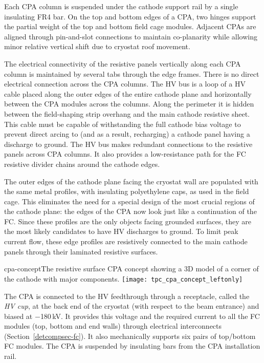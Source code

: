 Each CPA column is suspended under the cathode support rail by a single insulating FR4 bar.  On the top and bottom edges of a CPA, two hinges support the partial weight of the top and bottom field cage modules.   Adjacent CPAs are aligned through pin-and-slot connections to maintain co-planarity while allowing minor relative vertical shift due to cryostat roof movement.

The electrical connectivity of the resistive panels vertically along each CPA column is maintained by several tabs through the edge frames.  There is no direct electrical connection across the CPA columns. 
The HV bus is a loop of a HV cable placed along the outer edges of the entire cathode plane and horizontally between the CPA modules across the columns. Along the perimeter it is hidden between the field-shaping strip overhang and the main cathode resistive sheet.  This cable must be capable of withstanding the full cathode bias voltage to prevent direct arcing to (and as a result, recharging) a cathode panel having a discharge to ground. 
The HV bus makes redundant connections to the resistive panels across CPA columns.  It also provides a low-resistance path for the FC resistive divider chains around the cathode edges.

The outer edges of the cathode plane facing the cryostat wall are populated with the same metal profiles, with insulating polyethylene caps, as used in the field cage.  This eliminates the need for a special design of the most crucial regions of the cathode plane: the edges of the CPA now look just like a continuation of the FC.  Since these profiles are the only objects facing grounded surfaces, they are the most likely candidates to have HV discharges to ground.   To limit peak current flow, these edge profiles are resistively connected to the main cathode panels through their laminated resistive surfaces.  

\begin{cdrfigure}{cpa-concept}{The resistive surface CPA concept showing  
 a 3D model of a corner of the cathode with major components.} 
\texttt{[image: tpc\_cpa\_concept\_leftonly]}
\end{cdrfigure}


The CPA is connected to the HV feedthrough through a receptacle, called the \textit{HV cup}, at the back end of the cryostat (with respect to the beam entrance) and biased at $-$180\,kV.   It provides this voltage and the required current to all the FC modules (top, bottom and end walls) through electrical interconnects (Section~\ref{detcompsec-fc}).  It also mechanically supports six pairs of top/bottom FC modules. The CPA is suspended by insulating bars from the CPA installation rail.


